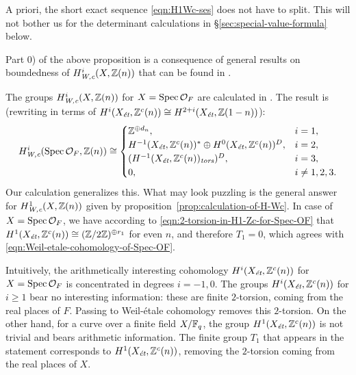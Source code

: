 \documentclass{article}
\numberwithin{equation}{section}
\begin{document}
\begin{remark}
  A priori, the short exact sequence \eqref{eqn:H1Wc-ses} does not have to
  split. This will not bother us for the determinant calculations in
  \S\ref{sec:special-value-formula} below.
\end{remark}

\begin{remark}
  Part 0) of the above proposition is a consequence of general results on
  boundedness of $H^i_\Wc (X,\ZZ(n))$ that can be found in
  \cite[\S 7]{Beshenov-Weil-etale-1}.
\end{remark}

\begin{remark}
  The groups $H^i_\Wc (X, \ZZ(n))$ for $X = \Spec \mathcal{O}_F$ are calculated
  in \cite[\S 5.8.3]{Flach-Morin-2018}. The result is (rewriting in terms of
  $H^i (X_\et, \ZZ^c(n)) \cong H^{2+i} (X_\et, \ZZ (1-n))$):
  \begin{equation}
    \label{eqn:Weil-etale-cohomology-of-Spec-OF}
    H^i_\Wc (\Spec \mathcal{O}_F, \ZZ(n)) \cong
    \begin{cases}
      \ZZ^{\oplus d_n}, & i = 1, \\
      H^{-1} (X_\et, \ZZ^c (n))^* \oplus H^0 (X_\et, \ZZ^c (n))^D, & i = 2, \\
      (H^{-1} (X_\et, \ZZ^c (n))_\tors)^D, & i = 3, \\
      0, & i \ne 1,2,3.
    \end{cases}
  \end{equation}
  Our calculation generalizes this. What may look puzzling is the general answer
  for $H^1_\Wc (X,\ZZ(n))$ given by
  proposition~\ref{prop:calculation-of-H-Wc}. In case of
  $X = \Spec \mathcal{O}_F$, we have according to
  \eqref{eqn:2-torsion-in-H1-Zc-for-Spec-OF} that
  $H^1 (X_\et, \ZZ^c(n)) \cong (\ZZ/2\ZZ)^{\oplus r_1}$ for even $n$, and
  therefore $T_1 = 0$, which agrees with
  \eqref{eqn:Weil-etale-cohomology-of-Spec-OF}.

  Intuitively, the arithmetically interesting cohomology $H^i (X_\et, \ZZ^c(n))$
  for $X = \Spec \mathcal{O}_F$ is concentrated in degrees $i = -1,0$. The
  groups $H^i (X_\et, \ZZ^c (n))$ for $i \ge 1$ bear no interesting information:
  these are finite $2$-torsion, coming from the real places of $F$. Passing to
  Weil-étale cohomology removes this $2$-torsion. On the other hand, for a curve
  over a finite field $X/\FF_q$, the group $H^1 (X_\et, \ZZ^c (n))$ is not
  trivial and bears arithmetic information. The finite group $T_1$ that appears
  in the statement corresponds to $H^1 (X_\et, \ZZ^c (n))$, removing the
  $2$-torsion coming from the real places of $X$.
\end{remark}
\end{document}
